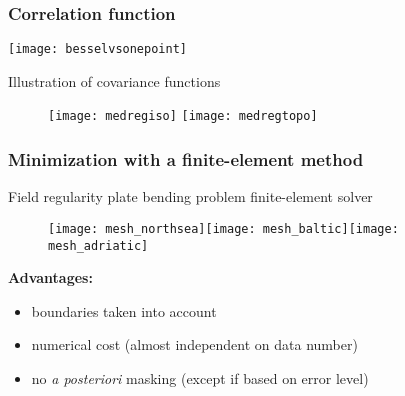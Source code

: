 \begin{frame}
\frametitle{Correlation function}

\centerline{\texttt{[image: besselvsonepoint]}}

\end{frame}


\begin{frame}{Illustration of covariance functions}
\vspace{-0.5cm}
\begin{figure}[H]
\begin{center}
\texttt{[image: medregiso]}
\vspace{0cm}
\texttt{[image: medregtopo]}
\end{center}
\end{figure}

\end{frame}

\begin{frame}
\footnotesize
\frametitle{Minimization with a finite-element method}

Field regularity \fleche plate bending problem \fleche finite-element solver

\begin{figure}[H]
\centering
\texttt{[image: mesh\_northsea]}\texttt{[image: mesh\_baltic]}\texttt{[image: mesh\_adriatic]}
\end{figure}
\textbf{Advantages:}
\begin{itemize}
\item boundaries taken into account
\item numerical cost (almost independent on data number)
\item no \textit{a posteriori} masking (except if based on error level) 
\end{itemize}

\end{frame}

